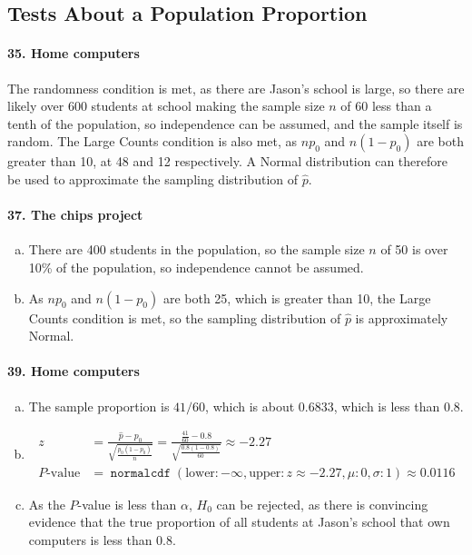 \documentclass[12pt, A4]{article}
\DeclareMathOperator{\normalcdf}{\texttt{normalcdf}}
\newcommand{\normalCDF}[4]{\normalcdf\left(\mathrm{lower}: #1, \mathrm{upper}: #2, \mu: #3, \sigma: #4\right)}
\newcommand{\propse}[2]{\sqrt{\frac{#1\left(1 - #1\right)}{#2}}}
\newcommand{\z}[3]{\frac{#1 - #2}{#3}}
\begin{document}
		\subsection{Tests About a Population Proportion}
			\paragraph{35. Home computers}
				The randomness condition is met, as there are Jason's school is large, so there are likely over 600 students at school making the sample size $n$ of 60 less than a tenth of the population, so independence can be assumed, and the sample itself is random.
				The Large Counts condition is also met, as $np_0$ and $n(1 - p_0)$ are both greater than 10, at 48 and 12 respectively. A Normal distribution can therefore be used to approximate the sampling distribution of $\hat{p}$.
			\paragraph{37. The chips project}
				\begin{enumerate}[a.]
					\item
						There are 400 students in the population, so the sample size $n$ of 50 is over 10\% of the population, so independence cannot be assumed.
					\item
						As $np_0$ and $n(1 - p_0)$ are both 25, which is greater than 10, the Large Counts condition is met, so the sampling distribution of $\hat{p}$ is approximately Normal.
				\end{enumerate}
			\paragraph{39. Home computers}
				\begin{enumerate}[a.]
					\item
						The sample proportion is $41/60$, which is about 0.6833, which is less than 0.8.
					\item
						\begin{align*}
							z &= \z{\hat{p}}{p_0}{\propse{p_0}{n}} = \z{\frac{41}{60}}{0.8}{\propse{0.8}{60}} \approx -2.27 \\
							P\text{-value} &= \normalCDF{-\infty}{z \approx -2.27}{0}{1} \approx 0.0116
						\end{align*}
					\item
						As the $P$-value is less than $\alpha$, $H_0$ can be rejected, as there is convincing evidence that the true proportion of all students at Jason's school that own computers is less than 0.8.
				\end{enumerate}
\end{document}
